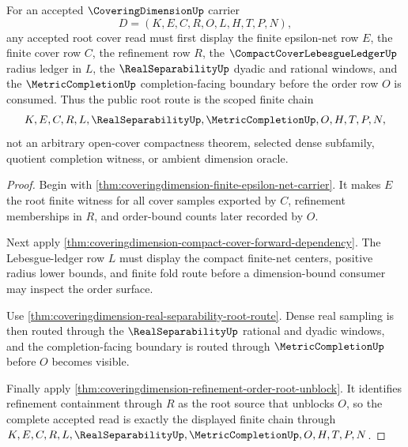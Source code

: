 \begin{theorem}
\label{thm:coveringdimension-root-cover-scope-route}
For an accepted $\CoveringDimensionUp$ carrier
$$
D=(K,E,C,R,O,L,H,T,P,N),
$$
any accepted root cover read must first display the finite epsilon-net row $E$, the finite cover row $C$, the refinement row $R$, the $\CompactCoverLebesgueLedgerUp$ radius ledger in $L$, the $\RealSeparabilityUp$ dyadic and rational windows, and the $\MetricCompletionUp$ completion-facing boundary before the order row $O$ is consumed. Thus the public root route is the scoped finite chain
$$
K,E,C,R,L,\RealSeparabilityUp,\MetricCompletionUp,O,H,T,P,N,
$$
not an arbitrary open-cover compactness theorem, selected dense subfamily, quotient completion witness, or ambient dimension oracle.
\end{theorem}
\begin{proof}
Begin with \autoref{thm:coveringdimension-finite-epsilon-net-carrier}. It makes $E$ the root finite witness for all cover samples exported by $C$, refinement memberships in $R$, and order-bound counts later recorded by $O$.

Next apply \autoref{thm:coveringdimension-compact-cover-forward-dependency}. The Lebesgue-ledger row $L$ must display the compact finite-net centers, positive radius lower bounds, and finite fold route before a dimension-bound consumer may inspect the order surface.

Use \autoref{thm:coveringdimension-real-separability-root-route}. Dense real sampling is then routed through the $\RealSeparabilityUp$ rational and dyadic windows, and the completion-facing boundary is routed through $\MetricCompletionUp$ before $O$ becomes visible.

Finally apply \autoref{thm:coveringdimension-refinement-order-root-unblock}. It identifies refinement containment through $R$ as the root source that unblocks $O$, so the complete accepted read is exactly the displayed finite chain through $K,E,C,R,L,\RealSeparabilityUp,\MetricCompletionUp,O,H,T,P,N$.
\end{proof}

